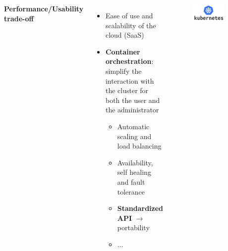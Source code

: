 \begin{frame}
  \vspace{0.2em}
  \begin{columns}
     \textbf{Performance/Usability trade-off}
    \begin{itemize}
      \itemsep0em
      \item \alert{Ease of use} and \alert{scalability} of the cloud (SaaS)
      \item \alert{\textbf{Container orchestration}}: simplify the interaction
        with the cluster for both the user and the administrator
      \begin{itemize}
        \itemsep0em
        \item Automatic scaling and load balancing
        \item Availability, self healing and fault tolerance
        \item \alert{\textbf{Standardized API}} $\to$ portability
        \item $\dots$
      \end{itemize}
    \end{itemize}
    \begin{figure}
      \centering
      \includegraphics[width=0.75\textwidth]{img/logos/kubernetes-logo}
    \end{figure}
    \end{columns}
\end{frame}
